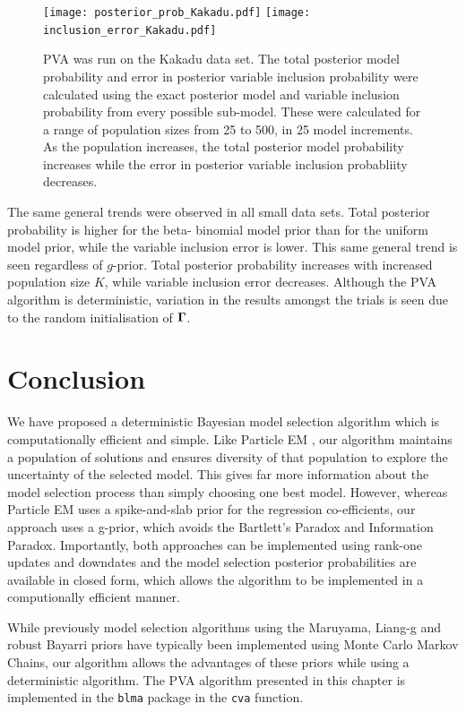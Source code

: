 \begin{figure}[ht!]
	\texttt{[image: posterior\_prob\_Kakadu.pdf]}
	\texttt{[image: inclusion\_error\_Kakadu.pdf]}

	\caption{PVA was run on the Kakadu data set. The total posterior model probability and error in posterior 
						variable inclusion probability were calculated using the exact posterior model and variable  
						inclusion probability from every possible sub-model. These were calculated for a range of 
						population sizes from 25 to 500, in 25 model increments.
						As the population increases, the total posterior model probability increases while the error in 
						posterior variable inclusion probabliity decreases.}
	\label{fig:kakadu_total_posterior_mass}
\end{figure}


The same general trends were observed in all small data sets. Total posterior probability is higher for the
beta- binomial model prior than for the uniform model prior, while the variable inclusion error is lower. This
same general trend is seen regardless of $g$-prior. Total posterior probability increases with increased
population size $K$, while variable inclusion error decreases. Although the PVA algorithm is deterministic,
variation in the results amongst the trials is seen due to the random initialisation of ${\boldsymbol \Gamma}$.

\section{Conclusion}
\label{sec:chapter_4_conclusion}
We have proposed a deterministic Bayesian model selection algorithm which is computationally efficient
and simple. Like Particle EM \cite{Rockova2017}, our algorithm maintains a population of solutions and ensures
diversity of that population to explore the uncertainty of the selected model. This gives far more information
about the model selection process than simply choosing one best model. However, whereas Particle EM uses
a spike-and-slab prior for the regression co-efficients, our approach uses a g-prior, which avoids 
the Bartlett's Paradox and Information Paradox. Importantly, both approaches can be implemented using rank-one
updates and downdates and the model selection posterior probabilities are available in closed form,
which allows the algorithm to be implemented in a computionally efficient manner.

While previously model selection algorithms using the Maruyama, Liang-g and robust Bayarri priors have
typically been implemented using Monte Carlo Markov Chains, our algorithm allows the advantages of these
priors while using a deterministic algorithm. The PVA algorithm  presented in this chapter is implemented in
the {\tt blma} package in the {\tt cva} function.
